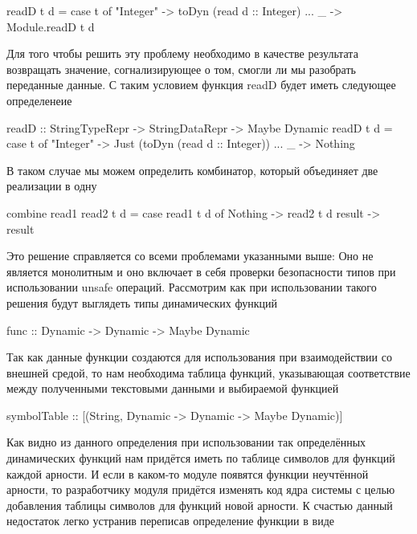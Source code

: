 \documentclass[a4paper,12pt]{article}
\newenvironment{code}{\footnotesize\verbatim}{\endverbatim\normalsize}
\begin{document}
\begin{code}
  readD t d = case t of
                "Integer" -> toDyn (read d :: Integer)
                ...
                _  -> Module.readD t d
\end{code}

Для того чтобы решить эту проблему необходимо в качестве результата
возвращать значение, согнализирующее о том, смогли ли мы разобрать
переданные данные. С таким условием функция readD будет иметь
следующее определенеие

\begin{code}
  readD :: StringTypeRepr -> StringDataRepr -> Maybe Dynamic
  readD t d = case t of
                "Integer" -> Just (toDyn (read d :: Integer))
                ...
                _  -> Nothing
\end{code}

В таком случае мы можем определить комбинатор, который объединяет две
реализации в одну

\begin{code}
  combine read1 read2 t d = case read1 t d of
                              Nothing -> read2 t d
                              result  -> result
\end{code}

Это решение справляется со всеми проблемами указанными выше: Оно не
является монолитным и оно включает в себя проверки безопасности типов
при использовании unsafe операций. Рассмотрим как при использовании
такого решения будут выглядеть типы динамических функций

\begin{code}
  func :: Dynamic -> Dynamic -> Maybe Dynamic
\end{code}

Так как данные функции создаются для использования при взаимодействии
со внешней средой, то нам необходима таблица функций, указывающая
соответствие между полученными текстовыми данными и выбираемой
функцией

\begin{code}
  symbolTable :: [(String, Dynamic -> Dynamic -> Maybe Dynamic)]
\end{code}

Как видно из данного определения при использовании так определённых
динамических функций нам придётся иметь по таблице символов для
функций каждой арности. И если в каком-то модуле появятся функции
неучтённой арности, то разработчику модуля придётся изменять код ядра
системы с целью добавления таблицы символов для функций новой
арности. К счастью данный недостаток легко устранив переписав
определение функции в виде
\end{document}
